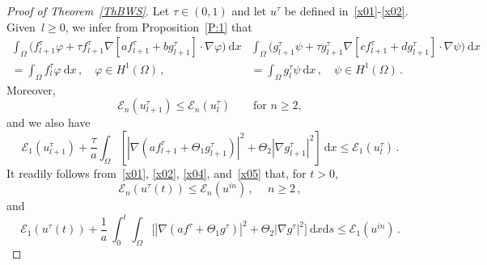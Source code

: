 \documentclass[10pt]{amsart}
\theoremstyle{definition}\newtheorem{defi}[theo]{Definition}\newtheorem{rema}[theo]{Remark}\newtheorem{exam}[theo]{Example}\newtheorem{exem}[theo]{Example}\newtheorem{nota}[theo]{Notation}
\newcommand{\clE}{\mathcal{E}}
\newcommand{\rmd}{\mathrm{d}}
\begin{document}
\begin{proof}[Proof of Theorem~\ref{ThBWS}]
Let $\tau\in (0,1)$ and let $u^\tau$ be defined in~\eqref{x01}-\eqref{x02}. Given~${l\ge 0}$, we infer from Proposition~\ref{P:1} that
\begin{subequations}\label{x03}
\begin{multline}\label{x03a}
\int_\Omega \Big(f_{l+1}^\tau \varphi + \tau f_{l+1}^\tau \nabla\left[af_{l+1}^\tau + b g_{l+1}^\tau\right] \cdot\nabla \varphi \Big)\ \rmd x \\
= \int_\Omega f_{l}^\tau \varphi\ \rmd x\,, \quad \varphi\in H^1(\Omega)\,, 
\end{multline}
\begin{multline}\label{x03b}
\int_\Omega \Big(g_{l+1}^\tau \psi + \tau g_{l+1}^\tau \nabla\left[cf_{l+1}^\tau + dg_{l+1}^\tau\right] \cdot\nabla\psi \Big)\ \rmd x \\
= \int_\Omega g_{l}^\tau \psi\ \rmd x\,, \quad \psi\in H^1(\Omega)\,. 
\end{multline}
\end{subequations}
Moreover,
\begin{equation}\label{x04}
\clE_n(u_{l+1}^\tau) \le \clE_n(u_{l}^\tau)\qquad\text{for }n\ge 2, 
\end{equation}
and we also have
\begin{equation}\label{x05}
\clE_1(u_{l+1}^\tau) +\frac{ \tau}{a} \int_\Omega \left[\left|\nabla \left(a f_{l+1}^\tau + \Theta_1g_{l+1}^\tau\right)\right|^2+\Theta_2\left|\nabla g_{l+1}^\tau\right|^2\right]\ \rmd x \le\clE_1(u_{l}^\tau)\,. 
\end{equation}
It readily follows from~\eqref{x01}, \eqref{x02}, \eqref{x04}, and~\eqref{x05} that, for $t>0$,
\begin{equation}\label{x06}
\clE_n(u^\tau(t)) \le \clE_n (u^{in}) \,, \quad \ n\ge 2\,, 
\end{equation}
and
\begin{equation}\label{x07}
\clE_1(u^\tau(t)) +\frac{ 1}{a} \ \int_0^t \int_\Omega \big[\left|\nabla \left(a f^\tau + \Theta_1g^\tau\right)\right|^2+\Theta_2\left|\nabla g^\tau\right|^2\big]\ \rmd x\rmd s \le \clE_1(u^{in})\,. 
\end{equation}


\end{proof}
\end{document}

